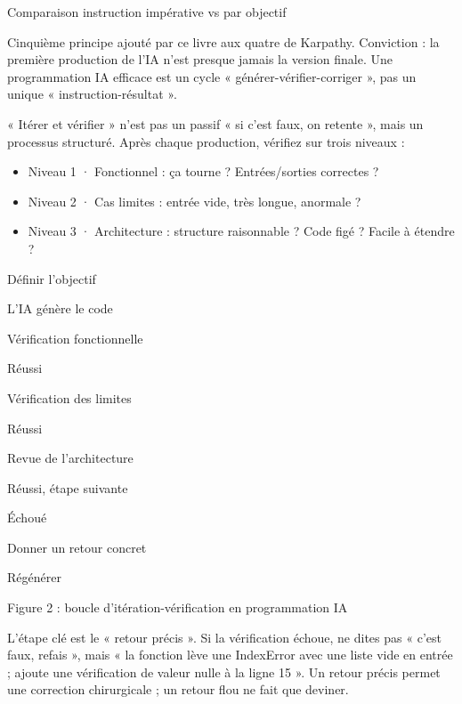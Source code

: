 \begin{center}\small\color{gray}Comparaison instruction impérative vs par objectif\end{center}


Cinquième principe ajouté par ce livre aux quatre de Karpathy. Conviction : la première production de l'IA n'est presque jamais la version finale. Une programmation IA efficace est un cycle « générer-vérifier-corriger », pas un unique « instruction-résultat ».

« Itérer et vérifier » n'est pas un passif « si c'est faux, on retente », mais un processus structuré. Après chaque production, vérifiez sur trois niveaux :

\begin{itemize}
  \item Niveau 1 · Fonctionnel : ça tourne ? Entrées/sorties correctes ?
  \item Niveau 2 · Cas limites : entrée vide, très longue, anormale ?
  \item Niveau 3 · Architecture : structure raisonnable ? Code figé ? Facile à étendre ?
\end{itemize}

Définir l'objectif

L'IA génère le code

Vérification fonctionnelle

Réussi

Vérification des limites

Réussi

Revue de l'architecture

Réussi, étape suivante

Échoué

Donner un retour concret

Régénérer

\begin{center}\small\color{gray}Figure 2 : boucle d'itération-vérification en programmation IA\end{center}

L'étape clé est le « retour précis ». Si la vérification échoue, ne dites pas « c'est faux, refais », mais « la fonction lève une IndexError avec une liste vide en entrée ; ajoute une vérification de valeur nulle à la ligne 15 ». Un retour précis permet une correction chirurgicale ; un retour flou ne fait que deviner.


